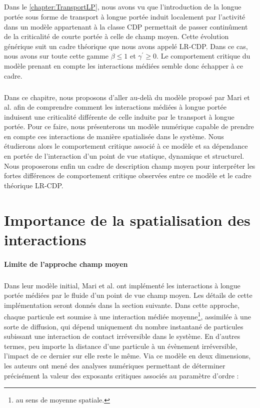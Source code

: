 \subparagraph{}Dans le \autoref{chapter:TransportLP}, nous avons vu que l'introduction de la longue portée sous forme de transport à longue portée induit localement par l'activité dans un modèle appartenant à la classe CDP permettait de passer continûment de la criticalité de courte portée à celle de champ moyen. Cette évolution générique suit un cadre théorique que nous avons appelé LR-CDP. Dans ce cas, nous avons sur toute cette gamme $\beta \leq 1$ et $\gamma^\prime \geq 0$. Le comportement critique du modèle prenant en compte les interactions médiées semble donc échapper à ce cadre.

\subparagraph{}Dans ce chapitre, nous proposons d'aller au-delà du modèle proposé par Mari et al. \cite{mari_absorbing_2022} afin de comprendre comment les interactions médiées à longue portée induisent une criticalité différente de celle induite par le transport à longue portée. Pour ce faire, nous présenterons un modèle numérique capable de prendre en compte ces interactions de manière spatialisée dans le système. Nous étudierons alors le comportement critique associé à ce modèle et sa dépendance en portée de l'interaction d'un point de vue statique, dynamique et structurel. Nous proposerons enfin un cadre de description champ moyen pour interpréter les fortes différences de comportement critique observées entre ce modèle et le cadre théorique LR-CDP.

\section{Importance de la spatialisation des interactions}

\paragraph{Limite de l'approche champ moyen}

\subparagraph{}Dans leur modèle initial, Mari et al. \cite{mari_absorbing_2022} ont implémenté les interactions à longue portée médiées par le fluide d'un point de vue champ moyen. Les détails de cette implémentation seront donnés dans la section suivante. Dans cette approche, chaque particule est soumise à une interaction médiée moyenne\footnote{au sens de moyenne spatiale.}, assimilée à une sorte de diffusion, qui dépend uniquement du nombre instantané de particules subissant une interaction de contact irréversible dans le système. En d'autres termes, peu importe la distance d'une particule à un évènement irréversible, l'impact de ce dernier sur elle reste le même. Via ce modèle en deux dimensions, les auteurs ont mené des analyses numériques permettant de déterminer précisément la valeur des exposants critiques associés au paramètre d'ordre :

